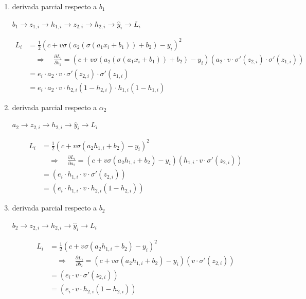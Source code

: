 \documentclass{article}
\begin{document}
\begin{enumerate}[label=\roman*]
\begin{enumerate}[label=\arabic*.]
    \item derivada parcial respecto a $b_1$
    
    $b_1 \longrightarrow z_{1,i} \longrightarrow h_{1,i}\longrightarrow z_{2,i} \longrightarrow h_{2,i}\longrightarrow \hat{y}_i \longrightarrow L_i$

    \[
    \begin{aligned}
    L_i &= \frac{1}{2}(c+v\sigma(a_2(\sigma(a_1x_i+b_1))+b_2) -y_i)^2\\
    &\quad\Rightarrow\quad
    \frac{\partial L_i}{\partial b_1}
    = (c+v\sigma(a_2(\sigma(a_1x_i+b_1))+b_2) -y_i)
    (a_2\cdot v \cdot \sigma'(z_{2,i}) \cdot \sigma'(z_{1,i}))\\
    &= e_i \cdot a_2\cdot v \cdot \sigma'(z_{2,i}) \cdot \sigma'(z_{1,i})\\
    &= e_i \cdot a_2\cdot v \cdot h_{2,i}(1 - h_{2,i}) \cdot h_{1,i}(1-h_{1,i})
    \end{aligned}
    \]

    \item derivada parcial respecto a $\alpha_2$

    $a_2 \longrightarrow z_{2,i} \longrightarrow h_{2,i}\longrightarrow \hat{y}_i \longrightarrow L_i$

    \[
    \begin{aligned}
    L_i &= \frac{1}{2}(c+v\sigma(a_2h_{1,i}+b_2) -y_i)^2\\
    &\quad\Rightarrow\quad
    \frac{\partial L_i}{\partial a_2}
    = (c+v\sigma(a_2h_{1,i}+b_2) -y_i)
    (h_{1,i}\cdot v \cdot \sigma'(z_{2,i}))\\
    &= (e_i \cdot h_{1,i}\cdot v \cdot \sigma'(z_{2,i}))\\
    &= (e_i \cdot h_{1,i}\cdot v \cdot h_{2,i}(1-h_{2,i}))
    \end{aligned}
    \]

    \item derivada parcial respecto a $b_2$
    
    $b_2 \longrightarrow z_{2,i} \longrightarrow h_{2,i}\longrightarrow \hat{y}_i \longrightarrow L_i$

    \[
      \begin{aligned}
        L_i &= \frac{1}{2}(c+v\sigma(a_2h_{1,i}+b_2) -y_i)^2\\
        &\quad\Rightarrow\quad
        \frac{\partial L_i}{\partial b_2}
        = (c+v\sigma(a_2h_{1,i}+b_2)-y_i)
        (v \cdot \sigma'(z_{2,i}))\\
        &= (e_i\cdot v \cdot \sigma'(z_{2,i}))\\
        &= (e_i \cdot v \cdot h_{2,i}(1-h_{2,i}))
      \end{aligned}
      \]


\end{enumerate}
\end{enumerate}
\end{document}

